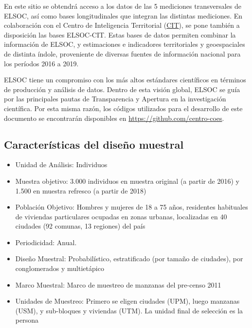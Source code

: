 \documentclass[
  12pt,
]{book}
\begin{document}
En este sitio se obtendrá acceso a los datos de las 5 mediciones transversales de ELSOC, así como bases longitudinales que integran las distintas mediciones. En colaboración con el Centro de Inteligencia Territorial (\href{https://cit.uai.cl/}{CIT}), se pone también a disposición las bases ELSOC-CIT. Estas bases de datos permiten combinar la información de ELSOC, y estimaciones e indicadores territoriales y geoespaciales de distinta índole, proveniente de diversas fuentes de información nacional para los períodos 2016 a 2019.

ELSOC tiene un compromiso con los más altos estándares científicos en términos de producción y análisis de datos. Dentro de esta visión global, ELSOC se guía por las principales pautas de Transparencia y Apertura en la investigación científica. Por esta misma razón, los códigos utilizados para el desarrollo de este documento se encontrarán disponibles en \url{https://github.com/centro-coes}.

\hypertarget{caracteruxedsticas-del-diseuxf1o-muestral}{%
\subsection*{Características del diseño muestral}\label{caracteruxedsticas-del-diseuxf1o-muestral}}

\begin{itemize}
\item
  Unidad de Análisis: Individuos
\item
  Muestra objetivo: 3.000 individuos en muestra original (a partir de 2016) y 1.500 en muestra refresco (a partir de 2018)
\item
  Población Objetivo: Hombres y mujeres de 18 a 75 años, residentes habituales de viviendas particulares ocupadas en zonas urbanas, localizadas en 40 ciudades (92 comunas, 13 regiones) del país
\item
  Periodicidad: Anual.
\item
  Diseño Muestral: Probabilístico, estratificado (por tamaño de ciudades), por conglomerados y multietápico
\item
  Marco Muestral: Marco de muestreo de manzanas del pre-censo 2011
\item
  Unidades de Muestreo: Primero se eligen ciudades (UPM), luego manzanas (USM), y sub-bloques y viviendas (UTM). La unidad final de selección es la persona
\end{itemize}
\end{document}
